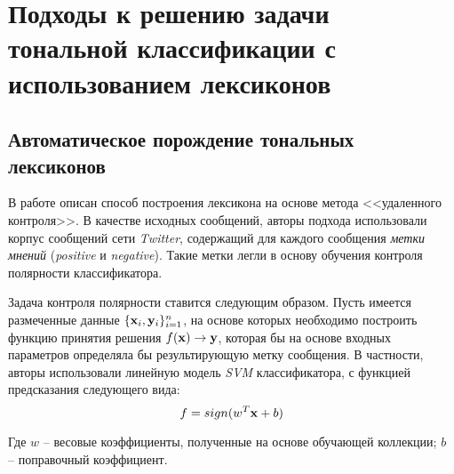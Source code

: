 \section{Подходы к решению задачи тональной классификации с использованием лексиконов}
    \subsection{Автоматическое порождение тональных лексиконов}
    В работе \cite{severyn} описан способ построения лексикона
    на основе метода <<удаленного контроля>>. В качестве исходных сообщений,
    авторы подхода использовали корпус сообщений сети {\it Twitter}, содержащий
    для каждого сообщения {\it метки мнений} ({\it positive} и {\it negative}).
    Такие метки легли в основу обучения контроля полярности классификатора.

    Задача контроля полярности ставится следующим образом. Пусть имеется
    размеченные данные $ \{{\bf x}_i, {\bf y}_i \}_{i=1}^{n}$, на основе
    которых необходимо построить функцию принятия решения
    $f({\bf x}) \to {\bf y}$, которая бы на основе входных параметров
    определяла бы результирующую метку сообщения.
    В частности, авторы использовали линейную модель {\it SVM} классификатора, с
    функцией предсказания следующего вида:
    \begin{equation}
        f = sign(w^T{\bf x} + b)
    \end{equation}

    Где $w$ -- весовые коэффициенты, полученные на основе обучающей коллекции;
    $b$ -- поправочный коэффициент.

